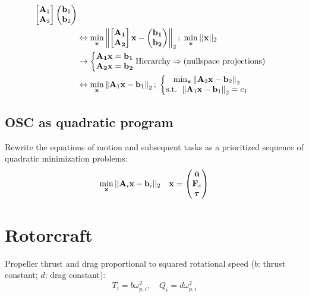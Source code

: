\documentclass[a4paper, 8pt]{extarticle}
\begin{document}
\begin{multicols*}{3}
\begin{align*}
\begin{bmatrix}
{\bf A}_1 \\ {\bf A}_2
\end{bmatrix}\begin{pmatrix}
{\bf b}_1\\ {\bf b}_2
\end{pmatrix} \\
& \Leftrightarrow \min_{\bf x}\left\lVert\begin{bmatrix}
\bf A_1 \\ \bf A_2
\end{bmatrix}{\bf x} - \begin{pmatrix}
\bf b_1\\ \bf b_2
\end{pmatrix}\right\rVert_2; \; \min_{\bf x}||{\bf x}||_2 \\
& \rightarrow \left\{ \begin{matrix}
\mathbf{A_1x = b_1}\\
\mathbf{A_2x = b_2}
\end{matrix}\right. \text{Hierarchy} \Rightarrow \text{(nullspace projections)} \\
& \Leftrightarrow \min_{\bf x}\left\lVert 
{\bf A}_1{\bf x} - {\bf b}_1 \right\rVert_2; \; \left\{ \begin{matrix}
\min_{\bf x}\left\lVert {\bf A}_2{\bf x} - {\bf b}_2 \right\rVert_2 \\
\text{s.t. } \left\lVert {\bf A}_1{\bf x} - {\bf b}_1 \right\rVert_2 = c_1
\end{matrix}\right.
\end{align*}


\subsection*{OSC as quadratic program}
Rewrite the equations of motion and subsequent tasks as a prioritized sequence of quadratic minimization problems:
$$\min_{\bf x} ||{\bf A}_i{\bf x - b}_i||_2 \quad {\bf x} = \begin{pmatrix}
\dot{\bf u} \\ {\bf F}_c \\ {\bm \tau}
\end{pmatrix}$$




\section{Rotorcraft}

Propeller thrust and drag proportional to squared rotational speed ($b$: thrust constant; $d$: drag constant):
$$T_i = b\omega_{p,i}^2, \quad Q_i = d\omega_{p,i}^2$$



\end{multicols*}
\end{document}
